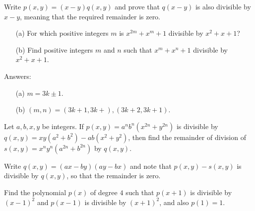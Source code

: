 \documentclass[12pt,a4paper]{memoir}
\theoremstyle{definition}
\begin{document}
\begin{solution}[name=Solution by Parviz Shahriari]
	Write $p(x,y)=(x-y)q(x,y)$ and prove that $q(x-y)$ is also divisible by $x-y$, meaning that the required remainder is zero.
\end{solution}


\begin{tcolorbox}
	\begin{question}
		\begin{itemize}
			\item[(a)] For which positive integers $m$ is $x^{2m}+x^m+1$ divisible by $x^2+x+1$?
			\item[(b)] Find positive integers $m$ and $n$ such that $x^{m}+x^n+1$ divisible by $x^2+x+1$.
		\end{itemize}
	\end{question}
\end{tcolorbox}

\begin{solution}[name=Solution by Parviz Shahriari]
	Answers:
	\begin{itemize}
		\item[(a)] $m=3k \pm 1$.
		\item[(b)] $(m,n)= (3k+1,3k+), (3k+2,3k+1)$. 
	\end{itemize}
\end{solution}


\begin{tcolorbox}
	\begin{question}
		Let $a,b,x,y$ be integers. If $p(x,y)=a^nb^n(x^{2n}+y^{2n})$ is divisible by $q(x,y)=xy(a^2+b^2)-ab(x^2+y^2)$, then find the remainder of division of $s(x,y)=x^ny^n(a^{2n}+b^{2n})$ by $q(x,y)$. 
	\end{question}
\end{tcolorbox}

\begin{solution}[name=Solution by Parviz Shahriari]
	Write $q(x,y) = (ax-by)(ay-bx)$ and note that $p(x,y) - s(x,y)$ is divisible by $q(x,y)$, so that the remainder is zero.
\end{solution}


\begin{tcolorbox}
	\begin{question}
		Find the polynomial $p(x)$ of degree $4$ such that $p(x+1)$ is divisible by $(x-1)^2$ and $p(x-1)$ is divisible by $(x+1)^2$, and also $p(1)=1$.
	\end{question}
\end{tcolorbox}
\end{document}

